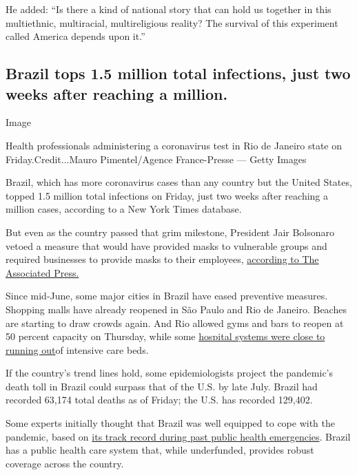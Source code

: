 He added: ``Is there a kind of national story that can hold us together
in this multiethnic, multiracial, multireligious reality? The survival
of this experiment called America depends upon it.''

\hypertarget{brazil-tops-15-million-total-infections-just-two-weeks-after-reaching-a-million}{%
\subsection{Brazil tops 1.5 million total infections, just two weeks
after reaching a
million.}\label{brazil-tops-15-million-total-infections-just-two-weeks-after-reaching-a-million}}

Image

Health professionals administering a coronavirus test in Rio de Janeiro
state on Friday.Credit...Mauro Pimentel/Agence France-Presse --- Getty
Images

Brazil, which has more coronavirus cases than any country but the United
States, topped 1.5 million total infections on Friday, just two weeks
after reaching a million cases, according to a New York Times database.

But even as the country passed that grim milestone, President Jair
Bolsonaro vetoed a measure that would have provided masks to vulnerable
groups and required businesses to provide masks to their employees,
\href{https://apnews.com/ea560c3c7e0766f3f4eb0f77f958140a}{according to
The Associated Press.}

Since mid-June, some major cities in Brazil have eased preventive
measures. Shopping malls have already reopened in São Paulo and Rio de
Janeiro. Beaches are starting to draw crowds again. And Rio allowed gyms
and bars to reopen at 50 percent capacity on Thursday, while some
\href{https://www1.folha.uol.com.br/cotidiano/2020/06/noves-estados-estao-com-mais-de-80-das-utis-lotadas.shtml}{hospital
systems were close to running out}of intensive care beds.

If the country's trend lines hold, some epidemiologists project the
pandemic's death toll in Brazil could surpass that of the U.S. by late
July. Brazil had recorded 63,174 total deaths as of Friday; the U.S. has
recorded 129,402.

Some experts initially thought that Brazil was well equipped to cope
with the pandemic, based on
\href{https://www.nytimes3xbfgragh.onion/2020/05/16/world/americas/virus-brazil-deaths.html}{its
track record during past public health emergencies}. Brazil has a public
health care system that, while underfunded, provides robust coverage
across the country.

